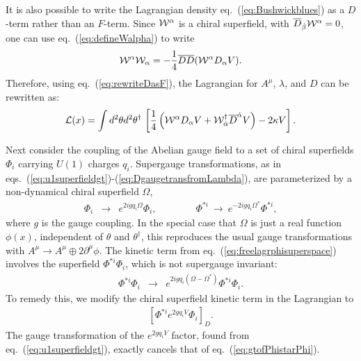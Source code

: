 \documentclass[11pt]{article}
\def\BDminus{-}
\def\BDminus{+}
\def\BDminus{\ominus}
\def\BDminus{\oplus}
\def\beq{\begin{eqnarray}}
\def\eeq{\end{eqnarray}}
\def\Dcon{\overline D}
\begin{document}
It is also possible to write the Lagrangian density eq.~(\ref{eq:Bushwickblues}) 
as a $D$-term rather 
than an $F$-term. Since ${\cal W}^\alpha$ is a chiral superfield, with 
$\Dcon_{\dot \beta} {\cal W}^\alpha = 0$, one can use 
eq.~(\ref{eq:defineWalpha}) to write
\beq
{\cal W}^\alpha {\cal W}_\alpha = 
-\frac{1}{4} \Dcon\Dcon ({\cal W}^\alpha D_\alpha V).
\eeq
Therefore, using eq.~(\ref{eq:rewriteDasF}), 
the Lagrangian for $A^\mu$, $\lambda$, and $D$ can be rewritten as:
\beq
{\cal L}(x) = \int d^2\theta d^2\theta^\dagger \, \left [
\frac{1}{4}
\left (
{\cal W}^\alpha D_\alpha V 
+ {\cal W}^\dagger_{\dot\alpha} \Dcon^{\dot\alpha} V \right ) - 2 \kappa V
\right ].
\eeq


Next consider the coupling of the Abelian gauge field to a set of chiral 
superfields $\Phi_i$ carrying $U(1)$ charges $q_i$. Supergauge transformations, as in 
eqs.~(\ref{eq:u1superfieldgt})-(\ref{eq:DgaugetransfromLambda}), are 
parameterized by a non-dynamical chiral 
superfield $\Omega$,
\beq
\Phi_i &\rightarrow& e^{2ig q_i \Omega} \Phi_i ,
\qquad\qquad
\Phi^{*i} \>\rightarrow\> e^{-2ig q_i \Omega^*} \Phi^{*i} ,
\eeq
where $g$ is the gauge coupling. 
In the special case that $\Omega$ is 
just a real function $\phi(x)$, independent of $\theta$ and $\theta^\dagger$, 
this reproduces the usual gauge transformations with $A^\mu \rightarrow 
A^\mu \BDminus 2 \partial^\mu \phi$. 
The kinetic term 
from eq.~(\ref{eq:freelagrphisuperspace}) 
involves the superfield 
$\Phi^{*i} \Phi_i$, which is not supergauge invariant:
\beq
\Phi^{*i} \Phi_i &\rightarrow& 
e^{2ig q_i(\Omega - \Omega^*)} \Phi^{*i} \Phi_i .
\label{eq:gtofPhistarPhi}
\eeq
To remedy this, we modify the chiral superfield kinetic term in the Lagrangian to
\beq
\left [ \Phi^{*i} e^{2 g q_i V} \Phi_i \right ]_D .
\eeq
The gauge transformation of the 
$e^{2 g q_i V}$ factor, found from 
eq.~(\ref{eq:u1superfieldgt}),
exactly cancels that 
of eq.~(\ref{eq:gtofPhistarPhi}).
\end{document}
